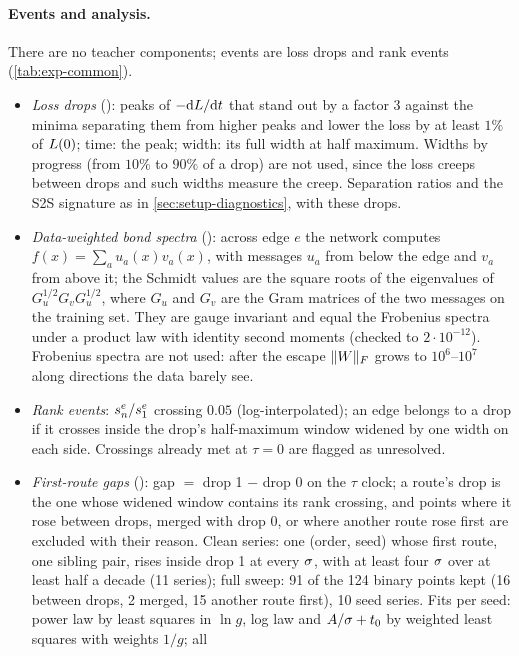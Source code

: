 \paragraph{Events and analysis.}
There are no teacher components; events are loss drops and rank events (\cref{tab:exp-common}).
\begin{itemize}
  \item \emph{Loss drops} (): peaks of $-\mathrm{d}L/\mathrm{d} t$ that stand out by a factor 3
    against the minima separating them from higher peaks and lower the loss by at least $1\%$ of
    $L(0)$; time: the peak; width: its full width at half maximum. Widths by progress (from $10\%$ to
    $90\%$ of a drop) are not used, since the loss creeps between drops and such widths measure the
    creep. Separation ratios and the S2S signature as in \cref{sec:setup-diagnostics}, with these drops.
  \item \emph{Data-weighted bond spectra} (): across edge $e$ the network
    computes $f(x)=\sum_au_a(x)v_a(x)$, with messages $u_a$ from below the edge and $v_a$ from above it; the
    Schmidt values are the square roots of the eigenvalues of $G_u^{1/2}G_vG_u^{1/2}$, where $G_u$ and $G_v$
    are the Gram matrices of the two messages on the training set. They are gauge invariant and equal
    the Frobenius spectra under a product law with identity second moments (checked to
    $2\cdot10^{-12}$). Frobenius spectra are not used: after the escape $\lVert W\rVert_{F}$ grows to
    $10^6$--$10^7$ along directions the data barely see.
  \item \emph{Rank events}: $s^{e}_{n}/s^{e}_{1}$ crossing $0.05$ (log-interpolated); an edge belongs to a drop if
    it crosses inside the drop's half-maximum window widened by one width on each side. Crossings already
    met at $\tau=0$ are flagged as unresolved.
  \item \emph{First-route gaps} (): gap $=$ drop 1 $-$ drop 0 on the $\tau$ clock; a route's
    drop is the one whose widened window contains its rank crossing, and points where it rose between
    drops, merged with drop 0, or where another route rose first are excluded with their reason. Clean
    series: one (order, seed) whose first route, one sibling pair, rises inside drop 1 at every $\sigma$, with at
    least four $\sigma$ over at least half a decade (11 series); full sweep: 91 of the 124 binary points
    kept (16 between drops, 2 merged, 15 another route first), 10 seed series. Fits per seed: power law
    by least squares in $\ln g$, log law and $A/\sigma+t_0$ by weighted least squares with weights $1/g$; all

\end{itemize}
